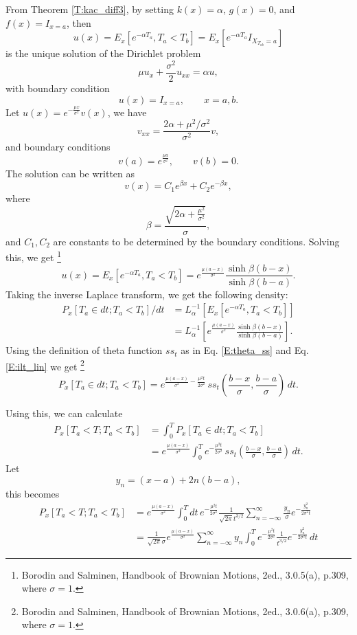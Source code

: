 From Theorem \ref{T:kac_diff3}, by setting $k(x)=\alpha$, $g(x)=0$, and
$f(x)=I_{x=a}$, then 
\[
	u(x) = E_x[e^{-\alpha T_a}, T_a<T_b] 
	= E_x[e^{-\alpha T_a} I_{X_{T_{ab}}=a}]
\]
is the unique solution of the Dirichlet problem
\[
	 \mu u_{x} + \frac{\sigma^2}{2} u_{xx} = \alpha u,
\]
with boundary condition
\[
	u(x)= I_{x=a}, \qquad x=a,b.
\]
Let $u(x) = e^{-\frac{\mu x}{\sigma^2}} v(x)$, we have
\[
	v_{xx}=\frac{2\alpha + \mu^2 / \sigma^2}{\sigma^2} v,
\]
and boundary conditions
\[
	v(a)=e^{\frac{\mu a}{\sigma^2}}, \qquad v(b)=0.
\]
The solution can be written as 
\[
	v(x)=C_1 e^{\beta x} + C_2 e^{-\beta x},
\]
where 
\[
	\beta = \frac{\sqrt{2\alpha+\frac{\mu^2}{\sigma^2}}}{\sigma},
\]
and $C_1,C_2$ are constants to be determined by the boundary conditions.
Solving this, we get
\footnote{Borodin and Salminen, Handbook of Brownian Motions, 2ed., 3.0.5(a),
  p.309, where $\sigma=1$.}
\begin{equation}
	u(x) = E_x[e^{-\alpha T_a}, T_a<T_b] 
	     = e^{\frac{\mu (a-x)}{\sigma^2} } 
	       \frac{\sinh \beta (b-x)}{\sinh \beta(b-a)}.
\end{equation}
Taking the inverse Laplace transform, we get the following density:
\begin{align*}
	P_x[T_a\in dt; T_a<T_b]/dt 
	&= L_{\alpha}^{-1} \left[  E_x[e^{-\alpha T_a}, T_a<T_b] \right] \\
	&= L_{\alpha}^{-1} 
	   \left[ 
		  e^{\frac{\mu (a-x)}{\sigma^2} } \frac{\sinh \beta (b-x)}{\sinh \beta(b-a)}
     \right]. 
\end{align*}
Using the definition of theta function $ss_t$ as in Eq. \ref{E:theta_ss} and Eq.
\ref{E:ilt_lin} we get
\footnote{Borodin and Salminen, Handbook of Brownian Motions, 2ed., 3.0.6(a),
  p.309, where $\sigma=1$.}
\begin{equation}
	P_x[T_a\in dt; T_a<T_b]  
	= e^{\frac{\mu (a-x)}{\sigma^2} - \frac{\mu^2 t}{2\sigma^2}}  \,
	  ss_t \left( \frac{b-x}{\sigma}, \frac{b-a}{\sigma} \right) \, dt.
\end{equation}

Using this, we can calculate
\begin{align*}
  P_x[T_a<T; T_a<T_b]  
    &= \int_0^T P_x[T_a\in dt; T_a<T_b]   \\
    &= e^{\frac{\mu (a-x)}{\sigma^2}} 
	   \int_0^T e^{- \frac{\mu^2 t}{2\sigma^2}}  \,
	  ss_t \left( \frac{b-x}{\sigma}, \frac{b-a}{\sigma} \right) \, dt.
\end{align*}
Let 
\begin{equation}
  y_n = (x-a) + 2n (b-a), 
\end{equation}
this becomes
\begin{align*}
  P_x[T_a<T; T_a<T_b]  
    &= e^{\frac{\mu (a-x)}{\sigma^2}} 
	   \int_0^T dt \, e^{- \frac{\mu^2 t}{2\sigma^2}}  
         \frac{1}{\sqrt{2\pi} t^{3/2}} 
         \sum_{n=-\infty}^{\infty} \frac{y_n}{\sigma} e^{-\frac{y_n^2}{2\sigma^2 t}} \\
    &= \frac{1}{\sqrt{2\pi}\sigma} e^{\frac{\mu (a-x)}{\sigma^2}} 
       \sum_{n=-\infty}^{\infty} y_n
	   \int_0^T e^{- \frac{\mu^2 t}{2\sigma^2}} \frac{1}{t^{3/2}} 
                e^{-\frac{y_n^2}{2\sigma^2 t}} \, dt
\end{align*}

